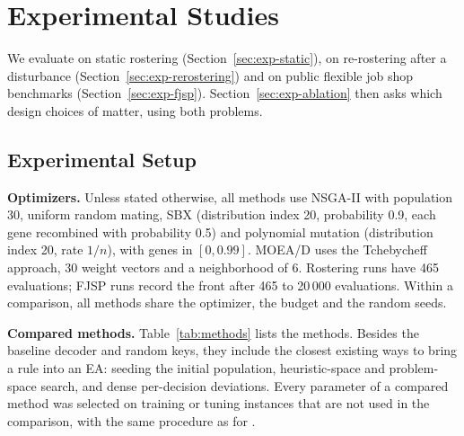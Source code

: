 \section{Experimental Studies}
\label{sec:experiments}


We evaluate \RDD on static rostering (Section~\ref{sec:exp-static}), on re-rostering after a disturbance (Section~\ref{sec:exp-rerostering}) and on public flexible job shop benchmarks (Section~\ref{sec:exp-fjsp}).
Section~\ref{sec:exp-ablation} then asks which design choices of \RDD matter, using both problems.

\subsection{Experimental Setup}
\label{sec:exp-setup}

\textbf{Optimizers.}
Unless stated otherwise, all methods use NSGA-II \cite{deb2002nsga2} with population 30, uniform random mating,
SBX (distribution index 20, probability 0.9, each gene recombined with probability 0.5) and polynomial mutation (distribution index 20, rate $1/n$), with genes in $[0, 0.99]$.
MOEA/D \cite{zhang2007moead} uses the Tchebycheff approach, 30 weight vectors and a neighborhood of 6.
Rostering runs have 465 evaluations; FJSP runs record the front after 465 to 20\,000 evaluations.
Within a comparison, all methods share the optimizer, the budget and the random seeds.

\textbf{Compared methods.}
Table~\ref{tab:methods} lists the methods.
Besides the baseline decoder and random keys, they include the closest existing ways to bring a rule into an EA:
seeding the initial population, heuristic-space and problem-space search, and dense per-decision deviations.
Every parameter of a compared method was selected on training or tuning instances that are not used in the comparison, with the same procedure as for \RDD.

